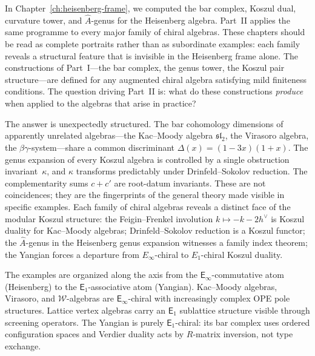 \documentclass[11pt]{memoir}
\newcommand{\Eone}{\mathsf{E}_1}
\newcommand{\Einf}{\mathsf{E}_{\infty}}
\begin{document}
\noindent
In Chapter~\ref{ch:heisenberg-frame}, we computed the bar complex, Koszul
dual, curvature tower, and $\hat{A}$-genus for the Heisenberg algebra.
Part~II applies the same programme to every major family of chiral
algebras.  These chapters should be read as complete portraits rather
than as subordinate examples: each family reveals a structural feature
that is invisible in the Heisenberg frame alone.
The constructions of Part~I---the bar complex, the genus tower, the Koszul
pair structure---are defined for any augmented chiral algebra satisfying mild finiteness
conditions.  The question driving Part~II is: what do these constructions
\emph{produce} when applied to the algebras that arise in practice?

The answer is unexpectedly structured.  The bar cohomology dimensions
of apparently unrelated algebras---the Kac--Moody algebra
$\widehat{\mathfrak{sl}}_2$, the Virasoro algebra, the
$\beta\gamma$-system---share a common discriminant
$\Delta(x) = (1-3x)(1+x)$.  The genus expansion of every Koszul
algebra is controlled by a single obstruction invariant~$\kappa$,
and $\kappa$ transforms predictably under Drinfeld--Sokolov
reduction.  The complementarity sums $c + c'$ are root-datum
invariants.  These are not coincidences; they are the fingerprints
of the general theory made visible in specific examples.  Each family
of chiral algebras reveals a distinct face of the modular Koszul
structure: the Feigin--Frenkel involution
$k \mapsto -k - 2h^\vee$ is Koszul duality for Kac--Moody
algebras; Drinfeld--Sokolov reduction is a Koszul functor;
the $\hat{A}$-genus in the Heisenberg genus expansion witnesses a
family index theorem; the Yangian forces a departure from
$E_\infty$-chiral to $E_1$-chiral Koszul duality.

The examples are organized along the axis from the
$\Einf$-commutative atom (Heisenberg) to the $\Eone$-associative
atom (Yangian).  Kac--Moody algebras, Virasoro, and
$\mathcal{W}$-algebras are $\Einf$-chiral with increasingly
complex OPE pole structures.  Lattice vertex algebras carry an
$\Eone$ sublattice structure visible through screening operators.
The Yangian is purely $\Eone$-chiral: its bar complex uses ordered
configuration spaces and Verdier duality acts by $R$-matrix
inversion, not type exchange.








\end{document}
